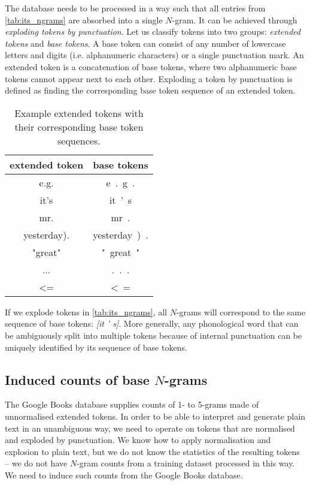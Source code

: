 \documentclass[draft]{IIBproject}
\makeatletter
\newcommand*{\ie}{i.e.\@\xspace}
\DeclareRobustCommand{\ngram}[1]{\emph{[#1]}}
\makeatother
\begin{document}
The database needs to be processed in a way such that all entries from \cref{tab:its_ngrams} are absorbed into a single $N$-gram. It can be achieved through \emph{exploding tokens by punctuation}. Let us classify tokens into two groups: \emph{extended tokens} and \emph{base tokens}. A base token can consist of any number of lowercase letters and digits (\ie alphanumeric characters) or a single punctuation mark. An extended token is a concatenation of base tokens, where two alphanumeric base tokens cannot appear next to each other. Exploding a token by punctuation is defined as finding the corresponding base token sequence of an extended token.

\begin{table}[h]
	\centering
	\begin{tabular}{c | c}
	extended token & base tokens \\
	\hline
	e.g. & e\ .\ g\ . \\
	it's & it\ '\ s \\
	mr. & mr\ . \\
	yesterday). & yesterday\ )\ . \\
	"great" & "\ great\ " \\
	... & .\ .\ . \\
	\textless= & \textless\ =
	\end{tabular}
	\caption{\label{tab:extended_tokens}Example extended tokens with their corresponding base token sequences.}
\end{table}

If we explode tokens in \cref{tab:its_ngrams}, all $N$-grams will correspond to the same sequence of base tokens: \ngram{it ' s}. More generally, any phonological word that can be ambiguously split into multiple tokens because of internal punctuation can be uniquely identified by its sequence of base tokens.

\subsection{Induced counts of base $N$-grams}

The Google Books database supplies counts of 1- to 5-grams made of unnormalised extended tokens. In order to be able to interpret and generate plain text in an unambiguous way, we need to operate on tokens that are normalised and exploded by punctuation. We know how to apply normalisation and explosion to plain text, but we do not know the statistics of the resulting tokens -- we do not have $N$-gram counts from a training dataset processed in this way. We need to induce such counts from the Google Books database.
\end{document}
